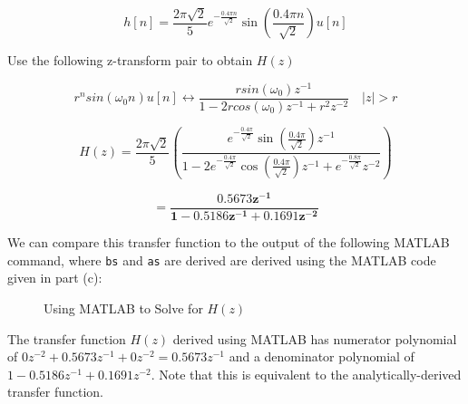 \documentclass[fleqn]{article}
\begin{document}
\begin{enumerate}[nolistsep]
\begin{enumerate}[nolistsep]
				\begin{equation*}
					h[n] = \frac{2\pi\sqrt{2}}{5}e^{-\frac{0.4{\pi}n}{\sqrt{2}}}\sin{\left(\frac{0.4{\pi}n}{\sqrt{2}}\right)}u[n]
				\end{equation*}
				
				Use the following z-transform pair to obtain $H(z)$
				
				\begin{equation*}
					r^{n}sin({\omega_0}n)u[n] \leftrightarrow \frac{rsin(\omega_0)z^{-1}}{1 - 2rcos(\omega_0)z^{-1} + r^{2}z^{-2}}\quad |z| > r
				\end{equation*}
				
				\begin{equation*}
					H(z) = \frac{2\pi\sqrt{2}}{5}\left(\frac{e^{-\frac{0.4\pi}{\sqrt{2}}}\sin{\left(\frac{0.4\pi}{\sqrt{2}}\right)z^{-1}}}{1 - 2e^{-\frac{0.4\pi}{\sqrt{2}}}\cos{\left(\frac{0.4\pi}{\sqrt{2}}\right)}z^{-1} + e^{-\frac{0.8\pi}{\sqrt{2}}}z^{-2}}\right)
				\end{equation*}
				
				\begin{equation*}
					\mathbf{= \frac{0.5673z^{-1}}{1 - 0.5186z^{-1} + 0.1691z^{-2}}}
				\end{equation*}
				
				We can compare this transfer function to the output of the following MATLAB command, where \texttt{bs} and \texttt{as} are derived are derived using the MATLAB code given in part (c):
				
				\begin{figure}[H]
					\centerline{}
					\caption{Using MATLAB to Solve for $H(z)$}
				\end{figure}
				
				The transfer function $H(z)$ derived using MATLAB has numerator polynomial of $0z^{-2} + 0.5673z^{-1} + 0z^{-2} = 0.5673z^{-1}$ and a denominator polynomial of $1 - 0.5186z^{-1} + 0.1691z^{-2}$. Note that this is equivalent to the analytically-derived transfer function.
				

\end{enumerate}
\end{enumerate}
\end{document}

